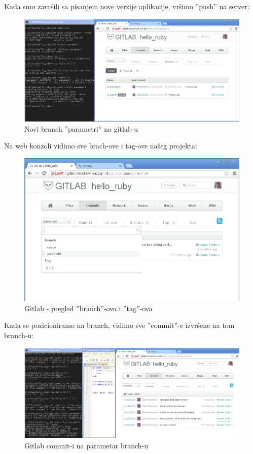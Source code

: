 \documentclass[times, utf8, seminar]{fit}
\begin{document}
Kada smo završili sa pisanjem nove verzije aplikacije, vršimo ''push'' na server:

\begin{figure}[H]
\centering
\includegraphics[width=15cm]{img/gitlab_new_branch.png}
\caption{Novi branch ''parametri'' na gitlab-u}
\end{figure}

Na web konzoli vidimo sve brach-ove i tag-ove našeg projekta:

\begin{figure}[H]
\centering
\includegraphics[width=15cm]{img/gitlab_new_branch_2.png}
\caption{Gitlab - pregled ''branch''-ova i ''tag''-ova}
\end{figure}

Kada se pozicioniramo na branch, vidimo sve ''commit''-e izvršene na tom branch-u:

\begin{figure}[H]
\centering
\includegraphics[width=16cm]{img/gitlab_new_branch_4_commits.png}
\caption{Gitlab commit-i na parametar branch-u}
\end{figure}
\end{document}
